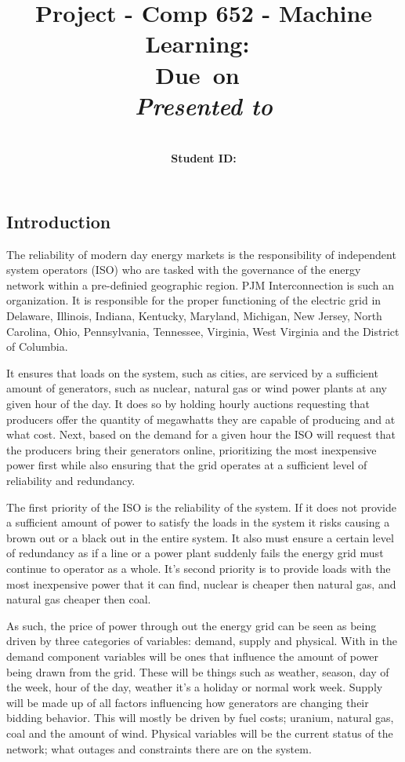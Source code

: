 \documentclass{report}
\title{Project - Comp 652 - Machine Learning}
\title{\vspace{2in}\textmd{\textbf{\hmwkClass:\ \hmwkTitle}}\\
\normalsize\vspace{0.1in}\small{Due\ on\ \hmwkDueDate}\\
\vspace{0.1in}\large{\textit{Presented to \hmwkClassInstructor}}\vspace{3in}}
\date{}
\author{\textbf{\hmwkAuthorName}\\
    \textbf{Student ID: \hmwkAuthorNumber}}
\begin{document}
\maketitle
\subsection*{Introduction}
The reliability of modern day energy markets is the responsibility of
independent system operators (ISO) who are tasked with the governance of the energy
network within a pre-definied geographic region. PJM Interconnection is such an
organization. It is responsible for the proper functioning of the electric grid
in Delaware, Illinois, Indiana, Kentucky, Maryland, Michigan, New Jersey,
North Carolina, Ohio, Pennsylvania, Tennessee, Virginia, West Virginia and the
District of Columbia.

It ensures that loads on the system, such as cities, are
serviced by a sufficient amount of generators, such as nuclear, natural gas or
wind power plants at any given hour of the day. It does so by holding hourly
auctions requesting that producers offer the quantity of megawhatts they are capable of
producing and at what cost. Next, based on the demand for a given hour the ISO
will request that the producers bring their generators online, prioritizing the
most inexpensive power first while also ensuring that the grid operates at a
sufficient level of reliability and redundancy.

The first priority of the ISO is the reliability of the system. If it does not
provide a sufficient amount of power to satisfy the loads in the system it
risks causing a brown out or a black out in the entire system. It also must
ensure a certain level of redundancy as if a line or a power plant suddenly
fails the energy grid must continue to operator as a whole. It's second
priority is to provide loads with the most inexpensive power that it can find,
nuclear is cheaper then natural gas, and natural gas cheaper then coal.

As such, the price of power through out the energy grid can be seen as being driven
by three categories of variables: demand, supply and physical. With in the demand
component variables will be ones that influence the amount of power being drawn from
the grid. These will be things such as weather, season, day of the week, hour of
the day, weather it's a holiday or normal work week. Supply will be made up of all
factors influencing how generators are changing their bidding behavior. This will
mostly be driven by fuel costs; uranium, natural gas, coal and the amount of wind.
Physical variables will be the current status of the network; what outages and
constraints there are on the system.
\end{document}
